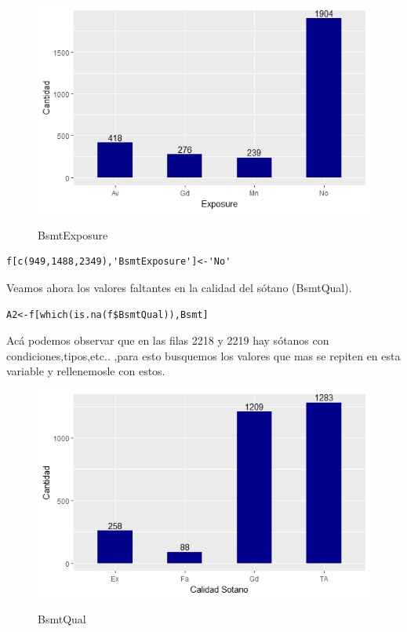 \documentclass{report}
\begin{document}
\begin{itemize}
\begin{itemize}
\begin{itemize}
\newpage
\begin{figure}[h]
	\centering
	\includegraphics[scale=0.8]{Exposure.JPEG}
	\label{p1}
	\caption{BsmtExposure}
\end{figure}

\begin{lstlisting}[frame=single]
f[c(949,1488,2349),'BsmtExposure']<-'No'
\end{lstlisting}
\vspace{2mm}

Veamos ahora los valores faltantes en la calidad del sótano (BsmtQual).\\

\begin{lstlisting}[frame=single]
A2<-f[which(is.na(f$BsmtQual)),Bsmt]
\end{lstlisting}
\vspace{2mm}

Acá podemos observar que en las filas 2218 y 2219 hay sótanos con condiciones,tipos,etc.. ,para esto busquemos los valores que mas se repiten en esta variable y rellenemosle con estos.\\

\begin{figure}[h]
	\centering
	\includegraphics[scale=0.8]{Calidadsotano.JPEG}
	\label{p1}
	\caption{BsmtQual}
\end{figure}


\end{itemize}
\end{itemize}
\end{itemize}
\end{document}
